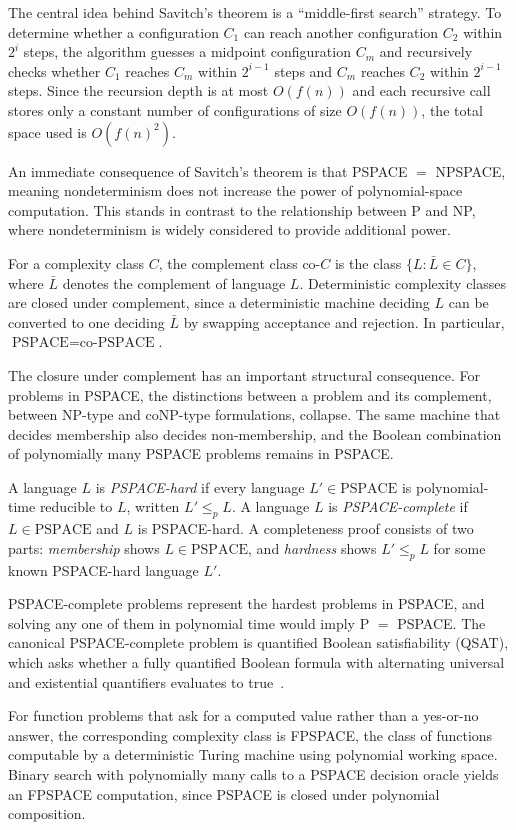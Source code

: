The central idea behind Savitch's theorem is a ``middle-first search'' strategy. To determine whether a configuration $C_1$ can reach another configuration $C_2$ within $2^i$ steps, the algorithm guesses a midpoint configuration $C_m$ and recursively checks whether $C_1$ reaches $C_m$ within $2^{i-1}$ steps and $C_m$ reaches $C_2$ within $2^{i-1}$ steps. Since the recursion depth is at most $O(f(n))$ and each recursive call stores only a constant number of configurations of size $O(f(n))$, the total space used is $O(f(n)^2)$.

An immediate consequence of Savitch's theorem is that PSPACE $=$ NPSPACE, meaning nondeterminism does not increase the power of polynomial-space computation. This stands in contrast to the relationship between P and NP, where nondeterminism is widely considered to provide additional power.

\begin{defn}
    \label{defn:co_pspace}
    For a complexity class $C$, the complement class $\text{co-}C$ is the class $\{L : \bar{L} \in C\}$, where $\bar{L}$ denotes the complement of language $L$. Deterministic complexity classes are closed under complement, since a deterministic machine deciding $L$ can be converted to one deciding $\bar{L}$ by swapping acceptance and rejection. In particular, $\text{PSPACE} = \text{co-PSPACE}$.
\end{defn}

The closure under complement has an important structural consequence. For problems in PSPACE, the distinctions between a problem and its complement, between NP-type and coNP-type formulations, collapse. The same machine that decides membership also decides non-membership, and the Boolean combination of polynomially many PSPACE problems remains in PSPACE.

\begin{defn}
    \label{defn:pspace_complete}
    A language $L$ is \emph{PSPACE-hard} if every language $L' \in \text{PSPACE}$ is polynomial-time reducible to $L$, written $L' \leq_p L$. A language $L$ is \emph{PSPACE-complete} if $L \in \text{PSPACE}$ and $L$ is PSPACE-hard. A completeness proof consists of two parts: \emph{membership} shows $L \in \text{PSPACE}$, and \emph{hardness} shows $L' \leq_p L$ for some known PSPACE-hard language $L'$.
\end{defn}

PSPACE-complete problems represent the hardest problems in PSPACE, and solving any one of them in polynomial time would imply P $=$ PSPACE. The canonical PSPACE-complete problem is quantified Boolean satisfiability (QSAT), which asks whether a fully quantified Boolean formula with alternating universal and existential quantifiers evaluates to true~\cite{Papadimitriou1994}.

For function problems that ask for a computed value rather than a yes-or-no answer, the corresponding complexity class is FPSPACE, the class of functions computable by a deterministic Turing machine using polynomial working space. Binary search with polynomially many calls to a PSPACE decision oracle yields an FPSPACE computation, since PSPACE is closed under polynomial composition.
